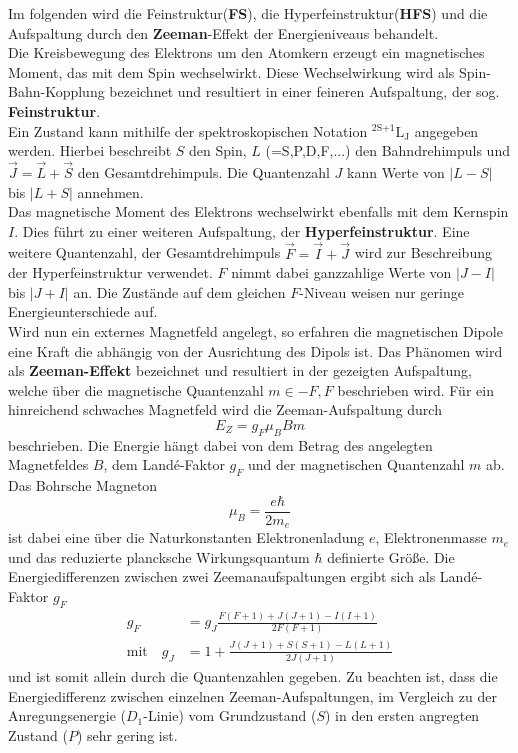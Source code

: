 Im folgenden wird die Feinstruktur(\textbf{FS}), die Hyperfeinstruktur(\textbf{HFS}) und die Aufspaltung durch den \textbf{Zeeman}-Effekt der Energieniveaus behandelt.
\\
Die Kreisbewegung des Elektrons um den Atomkern erzeugt ein magnetisches Moment, das mit dem Spin wechselwirkt.
Diese Wechselwirkung wird als Spin-Bahn-Kopplung bezeichnet und resultiert in einer feineren Aufspaltung, der sog. \textbf{Feinstruktur}.
\\
Ein Zustand kann mithilfe der spektroskopischen Notation $^\text{2S+1}\text{L}_\text{J}$ angegeben werden.
Hierbei beschreibt $S$ den Spin, $L$ (=S,P,D,F,...) den Bahndrehimpuls und $\vec{J} = \vec{L} + \vec{S}$ den Gesamtdrehimpuls.
Die Quantenzahl $J$ kann Werte von $|L-S|$ bis $|L+S|$ annehmen.
\\
Das magnetische Moment des Elektrons wechselwirkt ebenfalls mit dem Kernspin $I$.
Dies führt zu einer weiteren Aufspaltung, der \textbf{Hyperfeinstruktur}.
Eine weitere Quantenzahl, der Gesamtdrehimpuls $\vec{F} = \vec{I} + \vec{J}$ wird zur Beschreibung der Hyperfeinstruktur verwendet.
$F$ nimmt dabei ganzzahlige Werte von $|J-I|$ bis $|J+I|$ an.
Die Zustände auf dem gleichen $F$-Niveau weisen nur geringe Energieunterschiede auf.
\\
Wird nun ein externes Magnetfeld angelegt, so erfahren die magnetischen Dipole eine Kraft die abhängig von der Ausrichtung des Dipols ist.
Das Phänomen wird als \textbf{Zeeman-Effekt} bezeichnet und resultiert in der gezeigten Aufspaltung, welche über die magnetische Quantenzahl $m \in {-F, F}$ beschrieben wird.
Für ein hinreichend schwaches Magnetfeld wird die Zeeman-Aufspaltung durch
\begin{equation}
    E_Z = g_F \mu_B B m
\end{equation}
beschrieben.
Die Energie hängt dabei von dem Betrag des angelegten Magnetfeldes $B$, dem Landé-Faktor $g_F$ und der magnetischen Quantenzahl $m$ ab.
Das Bohrsche Magneton
\begin{equation}
    \mu_B = \frac{e \hbar}{2 m_e}
\end{equation}
ist dabei eine über die Naturkonstanten Elektronenladung $e$, Elektronenmasse $m_e$ und das reduzierte plancksche Wirkungsquantum $\hbar$ definierte Größe.
Die Energiedifferenzen zwischen zwei Zeemanaufspaltungen ergibt sich als Landé-Faktor $g_F$
\begin{align}
    g_F &= g_J \frac{F(F+1) + J(J+1) - I(I+1)}{2F(F+1)} \label{eqn:g_F} \\
    \text{mit} \quad g_J &= 1 + \frac{J(J+1) + S(S+1) - L(L+1)}{2J(J+1)} \label{eqn:g_J}
\end{align}
und ist somit allein durch die Quantenzahlen gegeben.
Zu beachten ist, dass die Energiedifferenz zwischen einzelnen Zeeman-Aufspaltungen, im Vergleich zu der Anregungsenergie ($D_1$-Linie) vom Grundzustand ($S$) in den ersten angregten Zustand ($P$) sehr gering ist.
\FloatBarrier

